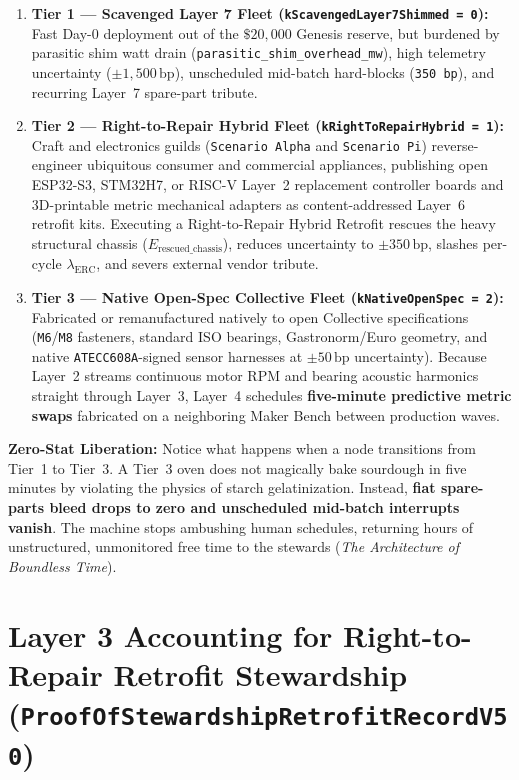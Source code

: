 \begin{enumerate}
    \item \textbf{Tier 1 — Scavenged Layer 7 Fleet (\texttt{kScavengedLayer7Shimmed = 0}):} Fast Day-0 deployment out of the $\$20{,}000$ Genesis reserve, but burdened by parasitic shim watt drain (\texttt{parasitic\_shim\_overhead\_mw}), high telemetry uncertainty ($\pm 1{,}500\,\mathrm{bp}$), unscheduled mid-batch hard-blocks (\texttt{350 bp}), and recurring Layer~7 spare-part tribute.
    \item \textbf{Tier 2 — Right-to-Repair Hybrid Fleet (\texttt{kRightToRepairHybrid = 1}):} Craft and electronics guilds (\texttt{Scenario Alpha} and \texttt{Scenario Pi}) reverse-engineer ubiquitous consumer and commercial appliances, publishing open ESP32-S3, STM32H7, or RISC-V Layer~2 replacement controller boards and 3D-printable metric mechanical adapters as content-addressed Layer~6 retrofit kits. Executing a Right-to-Repair Hybrid Retrofit rescues the heavy structural chassis ($E_{\mathrm{rescued\_chassis}}$), reduces uncertainty to $\pm 350\,\mathrm{bp}$, slashes per-cycle $\lambda_{\mathrm{ERC}}$, and severs external vendor tribute.
    \item \textbf{Tier 3 — Native Open-Spec Collective Fleet (\texttt{kNativeOpenSpec = 2}):} Fabricated or remanufactured natively to open Collective specifications (\texttt{M6}/\texttt{M8} fasteners, standard ISO bearings, Gastronorm/Euro geometry, and native \texttt{ATECC608A}-signed sensor harnesses at $\pm 50\,\mathrm{bp}$ uncertainty). Because Layer~2 streams continuous motor RPM and bearing acoustic harmonics straight through Layer~3, Layer~4 schedules \textbf{five-minute predictive metric swaps} fabricated on a neighboring Maker Bench between production waves.
\end{enumerate}

\textbf{Zero-Stat Liberation:} Notice what happens when a node transitions from Tier~1 to Tier~3. A Tier~3 oven does not magically bake sourdough in five minutes by violating the physics of starch gelatinization. Instead, \textbf{fiat spare-parts bleed drops to zero and unscheduled mid-batch interrupts vanish}. The machine stops ambushing human schedules, returning hours of unstructured, unmonitored free time to the stewards (\textit{The Architecture of Boundless Time}).

\section{Layer 3 Accounting for Right-to-Repair Retrofit Stewardship (\texttt{ProofOfStewardshipRetrofitRecordV50})}
\label{sec:ch6-retrofit-accounting}

